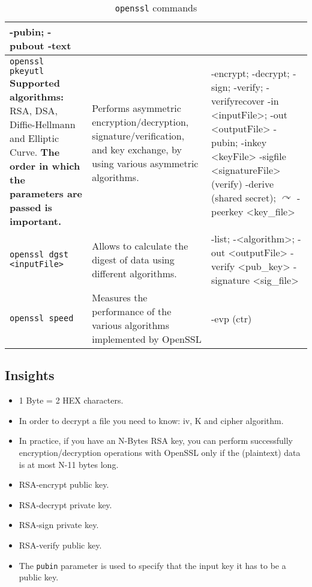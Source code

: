 \begin{table}[]
\begin{tabular}{|p{6cm}|p{3cm}|p{7cm}|}
				\newline -pubin; -pubout
				\newline -text
			\\ \hline
		\texttt{openssl pkeyutl} 
			\newline\newline \textbf{Supported algorithms:} RSA, DSA, Diffie-Hellmann and Elliptic Curve. \textbf{The order in which the parameters are passed is important.}
			& Performs asymmetric encryption/decryption, signature/verification, and key exchange, by using various asymmetric algorithms.
			& -encrypt; -decrypt; -sign; 
				\newline -verify; -verifyrecover
				\newline -in <inputFile>; -out <outputFile>
				\newline -pubin; -inkey <keyFile>
				\newline -sigfile <signatureFile> (verify)
				\newline -derive (shared secret); \(\curvearrowright\) \newline -peerkey <key\_file>
			\\ \hline
		\texttt{openssl dgst <inputFile>} 
			& Allows to calculate the digest of data using different algorithms.  
			& -list; 
				\newline -<algorithm>; -out <outputFile>
				\newline -verify <pub\_key> 
				\newline -signature <sig\_file>
			\\ \hline
		\texttt{openssl speed} 
			& Measures the performance of the various algorithms implemented by OpenSSL
			& -evp (ctr)
			\\ \hline
    \end{tabular}

    \caption{\texttt{openssl} commands}

    \label{tab:openssl}
\end{table}

\subsection*{Insights}
\begin{itemize}
\item 1 Byte = 2 HEX characters. 
\item In order to decrypt a file you need to know: iv, K and cipher algorithm.
\item In practice, if you have an N-Bytes RSA key, you can perform successfully encryption/decryption operations with OpenSSL only if the (plaintext) data is at most N-11 bytes long.
\item RSA-encrypt \textrightarrow public key.
\item RSA-decrypt \textrightarrow private key.
\item RSA-sign \textrightarrow private key.
\item RSA-verify \textrightarrow public key.
\item The \texttt{pubin} parameter is used to specify that the input key it has to be a public key.
\end{itemize}

